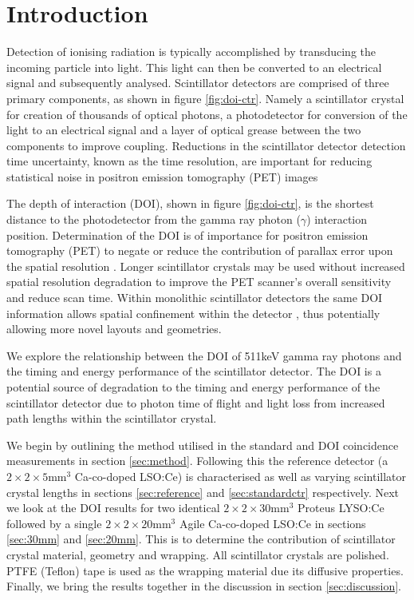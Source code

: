 \section{Introduction} 
Detection of ionising radiation is typically accomplished by transducing the incoming particle into light. This light can then be converted to an electrical signal and subsequently analysed. Scintillator detectors are comprised of three primary components, as shown in figure \ref{fig:doi-ctr}. Namely a scintillator crystal for creation of thousands of optical photons, a photodetector for conversion of the light to an electrical signal and a layer of optical grease between the two components to improve coupling. Reductions in the scintillator detector detection time uncertainty, known as the time resolution, are important for reducing statistical noise in positron emission tomography (PET) images

The depth of interaction (DOI), shown in figure \ref{fig:doi-ctr}, is the shortest distance to the photodetector from the gamma ray photon ($\gamma$) interaction position. Determination of the DOI is of importance for positron emission tomography (PET) to negate or reduce the contribution of parallax error upon the spatial resolution \cite{Moses_2001}\cite{Humm_Rosenfeld_Del_Guerra_2003}. Longer scintillator crystals may be used without increased spatial resolution degradation to improve the PET scanner's overall sensitivity and reduce scan time. Within monolithic scintillator detectors the same DOI information allows spatial confinement within the detector \cite{am_Borghi_Seifert_Schaart_2013}\cite{Maas_Bruyndonckx_Schaart_2012}, thus potentially allowing more novel\cite{Dendooven_Lohner_Beekman_2009}\cite{n_der_Lei_van_Dam_Schaart_2013} layouts and geometries.

We explore the relationship between the DOI of 511keV gamma ray photons and the timing and energy performance of the scintillator detector. The DOI is a potential source of degradation to the timing and energy performance of the scintillator detector due to photon time of flight and light loss from increased path lengths within the scintillator crystal.

We begin by outlining the method utilised in the standard and DOI coincidence measurements in section \ref{sec:method}. Following this the reference detector (a $2\times2\times5$mm$^3$ Ca-co-doped LSO:Ce) is characterised as well as varying scintillator crystal lengths in sections \ref{sec:reference} and \ref{sec:standardctr} respectively. Next we look at the DOI results for two identical $2\times2\times30$mm$^3$ Proteus LYSO:Ce followed by a single $2\times2\times20$mm$^3$ Agile Ca-co-doped LSO:Ce in sections \ref{sec:30mm} and \ref{sec:20mm}. This is to determine the contribution of scintillator crystal material, geometry and wrapping. All scintillator crystals are polished. PTFE (Teflon) tape is used as the wrapping material due its diffusive properties. Finally, we bring the results together in the discussion in section \ref{sec:discussion}.
